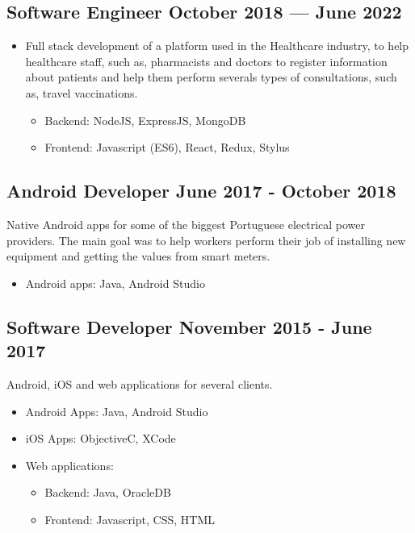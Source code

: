 \subsection{{Software Engineer \hfill October 2018 --- June 2022}}

\begin{itemize}
    \item Full stack development of a platform used in the Healthcare industry,
	to help healthcare staff, such as, pharmacists 
	and doctors to register information about patients and 
	help them perform severals types of consultations, 
	such as, travel vaccinations.
    \begin{itemize}
        \item Backend: NodeJS, ExpressJS, MongoDB
        \item Frontend: Javascript (ES6), React, Redux, Stylus
    \end{itemize}
\end{itemize}

\subsection{{Android Developer \hfill June 2017 - October 2018}}
\begin{zitemize}
\item Native Android apps for some of the biggest Portuguese 
electrical power providers. 
The main goal was to help workers perform their job of 
installing new equipment and getting the values 
from smart meters.
\begin{itemize}
    \item Android apps: Java, Android Studio
\end{itemize}
\end{zitemize}

\subsection{{Software Developer \hfill November 2015 - June 2017}}
\begin{zitemize}
\item Android, iOS and web applications for several clients.
\begin{itemize}
    \item Android Apps: Java, Android Studio
    \item iOS Apps: ObjectiveC, XCode
    \item Web applications:
    \begin{itemize}
        \item Backend: Java, OracleDB
	    \item Frontend: Javascript, CSS, HTML
    \end{itemize}
\end{itemize}
\end{zitemize}

